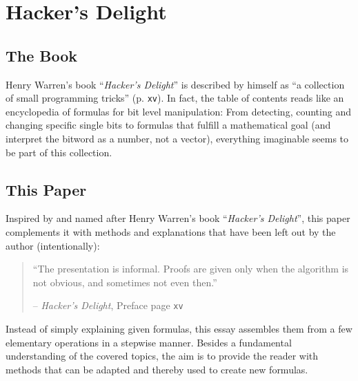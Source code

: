 \section{Hacker's Delight}\label{sec:book}
\subsection*{The Book}
Henry Warren's book ``\emph{Hacker's Delight}'' is described by himself as ``a collection of small programming tricks'' \cite{Warren:2012:HD:2462741} (p. \texttt{xv}).
In fact, the table of contents reads like an encyclopedia of formulas for bit level manipulation:
From detecting, counting and changing specific single bits to formulas that fulfill a mathematical goal (and interpret the bitword as a number, not a vector), everything imaginable seems to be part of this collection.

\subsection*{This Paper}
Inspired by and named after Henry Warren's book ``\emph{Hacker's Delight}''\cite{Warren:2012:HD:2462741},
this paper complements it with methods and explanations that have been left out by the author (intentionally):

\begin{quote}
``The presentation is informal. Proofs are given only when the algorithm is not obvious, and sometimes not even then.''

\hfill -- \emph{Hacker's Delight}, Preface page \texttt{xv} \cite{Warren:2012:HD:2462741}
\end{quote}

Instead of simply explaining given formulas,
this essay assembles them from a few elementary operations in a stepwise manner.
Besides a fundamental understanding of the covered topics,
the aim is to provide the reader with methods that can be adapted and thereby used to create new formulas.
